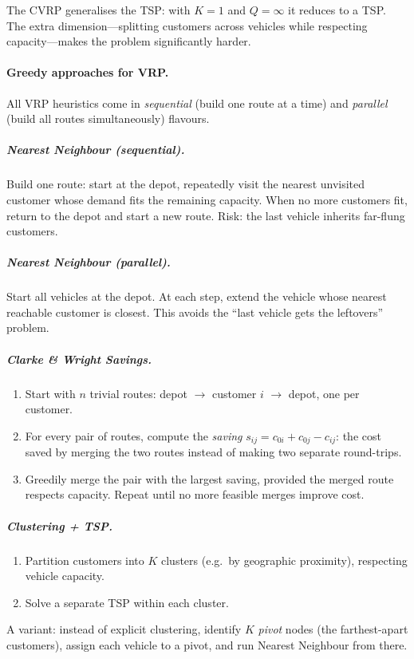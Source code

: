The CVRP generalises the TSP: with $K = 1$ and $Q = \infty$
it reduces to a TSP\@.  The extra dimension---splitting customers
across vehicles while respecting capacity---makes the problem
significantly harder.

\paragraph{Greedy approaches for VRP.}
All VRP heuristics come in \emph{sequential} (build one route at
a time) and \emph{parallel} (build all routes simultaneously)
flavours.

\subparagraph{Nearest Neighbour (sequential).}
Build one route: start at the depot, repeatedly visit the nearest
unvisited customer whose demand fits the remaining capacity.
When no more customers fit, return to the depot and start a new
route.  Risk: the last vehicle inherits far-flung customers.

\subparagraph{Nearest Neighbour (parallel).}
Start all vehicles at the depot.  At each step, extend the
vehicle whose nearest reachable customer is closest.
This avoids the ``last vehicle gets the leftovers'' problem.

\subparagraph{Clarke \& Wright Savings.}
\begin{enumerate}[nosep]
  \item Start with $n$ trivial routes: depot $\to$ customer $i$
        $\to$ depot, one per customer.
  \item For every pair of routes, compute the \emph{saving}
        $s_{ij} = c_{0i} + c_{0j} - c_{ij}$:
        the cost saved by merging the two routes instead of
        making two separate round-trips.
  \item Greedily merge the pair with the largest saving,
        provided the merged route respects capacity.
        Repeat until no more feasible merges improve cost.
\end{enumerate}

\subparagraph{Clustering + TSP.}
\begin{enumerate}[nosep]
  \item Partition customers into $K$ clusters (e.g.\ by
        geographic proximity), respecting vehicle capacity.
  \item Solve a separate TSP within each cluster.
\end{enumerate}
A variant: instead of explicit clustering, identify $K$
\emph{pivot} nodes (the farthest-apart customers), assign each
vehicle to a pivot, and run Nearest Neighbour from there.


